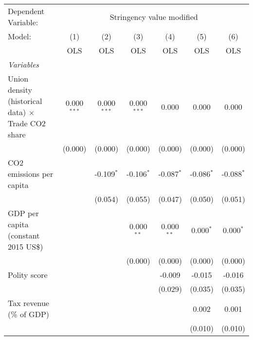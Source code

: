 
\begingroup
\centering
\begin{tabular}{lcccccc}
   \toprule
   Dependent Variable: & \multicolumn{6}{c}{Stringency value modified}\\
   Model:                                                    & (1)           & (2)           & (3)           & (4)          & (5)          & (6)\\  
                                                             &  OLS          & OLS           & OLS           & OLS          & OLS          & OLS\\  
   \midrule
   \emph{Variables}\\
   Union density (historical data) $\times$ Trade CO2 share  & 0.000$^{***}$ & 0.000$^{***}$ & 0.000$^{***}$ & 0.000        & 0.000        & 0.000\\   
                                                             & (0.000)       & (0.000)       & (0.000)       & (0.000)      & (0.000)      & (0.000)\\   
   CO2 emissions per capita                                  &               & -0.109$^{*}$  & -0.106$^{*}$  & -0.087$^{*}$ & -0.086$^{*}$ & -0.088$^{*}$\\   
                                                             &               & (0.054)       & (0.055)       & (0.047)      & (0.050)      & (0.051)\\   
   GDP per capita (constant 2015 US\$)                       &               &               & 0.000$^{**}$  & 0.000$^{**}$ & 0.000$^{*}$  & 0.000$^{*}$\\   
                                                             &               &               & (0.000)       & (0.000)      & (0.000)      & (0.000)\\   
   Polity score                                              &               &               &               & -0.009       & -0.015       & -0.016\\   
                                                             &               &               &               & (0.029)      & (0.035)      & (0.035)\\   
   Tax revenue (\% of GDP)                                   &               &               &               &              & 0.002        & 0.001\\   
                                                             &               &               &               &              & (0.010)      & (0.010)\\   

\end{tabular}
